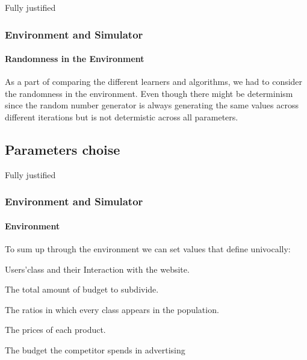 \documentclass{beamer}
\begin{document}

\begin{frame}{Fully justified}

\frametitle{Environment and Simulator}
\framesubtitle{Randomness in the Environment}

As a part of comparing the different learners and algorithms, we had to consider the randomness in the environment.
Even though there might be determinism since the random number generator is always generating the same values across different iterations but is not determistic across all parameters.

\end {frame}


\subsection{Parameters choise}

\begin{frame}{Fully justified}

\frametitle{Environment and Simulator}
\framesubtitle{Environment}

To sum up through the environment we can set values that define univocally:
\vspace{0.3cm}
\begin{list}{-}{\setlength{\itemsep}{0.4cm}}
    \item Users'class and their Interaction with the website.
    \item The total amount of budget to subdivide.
    \item The ratios in which every class appears in the population.
    \item The prices of each product.
    \item The budget the competitor spends in advertising
\end{list}

\end {frame}
\end{document}
